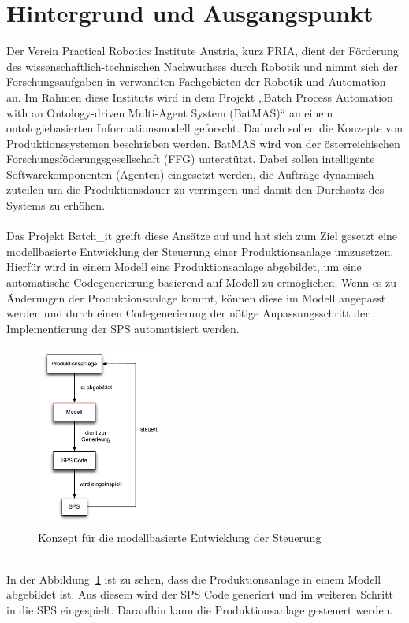 \section{Hintergrund und Ausgangspunkt}
Der Verein Practical Robotics Institute Austria, kurz PRIA, dient der Förderung des wissenschaftlich-technischen Nachwuchses durch Robotik und nimmt sich der Forschungsaufgaben in verwandten Fachgebieten der Robotik und Automation an.
Im Rahmen diese Instituts wird in dem Projekt „Batch Process Automation with an On\-to\-lo\-gy-driven Multi-Agent System (BatMAS)“ an einem ontologiebasierten Informationsmodell geforscht. Dadurch sollen die Konzepte von Produktionssystemen  beschrieben werden. BatMAS wird von  der österreichischen Forschungsföderungsgesellschaft (FFG) unterstützt. Dabei sollen intelligente Softwarekomponenten (Agenten) eingesetzt werden, die Aufträge dynamisch zuteilen um die Produktionsdauer zu verringern und damit den Durchsatz des Systems zu erhöhen.\\\\
Das Projekt Batch\_it greift diese Ansätze auf und hat sich zum Ziel gesetzt eine modellbasierte Entwicklung der Steuerung einer Produktionsanlage umzusetzen. Hierfür wird in einem Modell eine Produktionsanlage abgebildet, um eine automatische Codegenerierung basierend auf Modell zu ermöglichen. Wenn es zu Änderungen der Produktionsanlage kommt, können diese im Modell angepasst werden und durch einen Codegenerierung der nötige Anpassungsschritt der Implementierung der \ac{SPS} automatisiert werden.
\begin{figure}[h!]
		\centering
		\includegraphics[width=0.37\textwidth]{graphics/konzept/konzept.pdf}
		\caption{Konzept für die modellbasierte Entwicklung der Steuerung}
		\label{fig:konzept}
\end{figure} \\
In der Abbildung~\ref{fig:konzept} ist zu sehen, dass die Produktionsanlage in einem Modell abgebildet ist. Aus diesem wird der \ac{SPS} Code generiert und im weiteren Schritt in die \ac{SPS} eingespielt. Daraufhin kann die Produktionsanlage gesteuert werden. 

